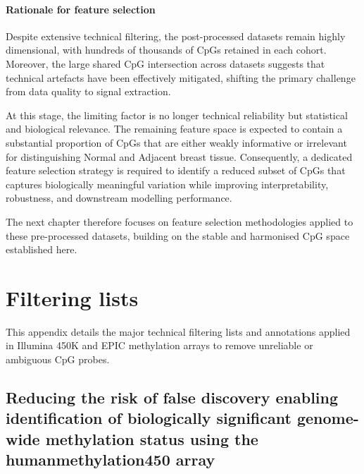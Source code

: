 \documentclass[10pt]{extarticle}
\begin{document}
\paragraph{Rationale for feature selection}
Despite extensive technical filtering, the post-processed datasets remain highly dimensional, with hundreds of thousands of CpGs retained in each cohort. Moreover, the large shared CpG intersection across datasets suggests that technical artefacts have been effectively mitigated, shifting the primary challenge from data quality to signal extraction.

At this stage, the limiting factor is no longer technical reliability but statistical and biological relevance. The remaining feature space is expected to contain a substantial proportion of CpGs that are either weakly informative or irrelevant for distinguishing Normal and Adjacent breast tissue. Consequently, a dedicated feature selection strategy is required to identify a reduced subset of CpGs that captures biologically meaningful variation while improving interpretability, robustness, and downstream modelling performance.

The next chapter therefore focuses on feature selection methodologies applied to these pre-processed datasets, building on the stable and harmonised CpG space established here.



\appendix
\section{Filtering lists}
\label{app:probe-filters}

This appendix details the major technical filtering lists and annotations applied in Illumina 450K and EPIC methylation arrays to remove unreliable or ambiguous CpG probes. 

\subsection{Reducing the risk of false discovery enabling identification of biologically significant genome-wide methylation status using the humanmethylation450 array}
\label{app:naeem2014}
\end{document}
